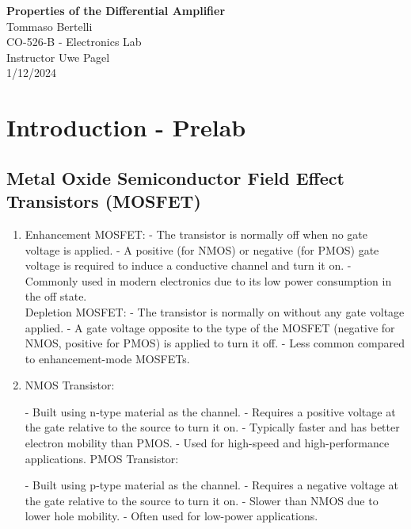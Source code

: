 \documentclass{article}
\begin{document}
	
	\mbox{}
	\vspace{10cm}
	\begin{center}
		\textbf{\Huge{Properties of the Differential Amplifier}}\\
		\bigskip
		\Large{Tommaso Bertelli}\\
		\bigskip
		\Large{CO-526-B - Electronics Lab}\\
		\bigskip
		\Large{Instructor Uwe Pagel}\\
		\bigskip
		\Large{1/12/2024}\\
	\end{center}
	\pagebreak
	
	\section{Introduction - Prelab}
		\subsection{Metal Oxide Semiconductor Field Effect Transistors (MOSFET)}
			\begin{enumerate}
				\item 
				Enhancement MOSFET:
				- The transistor is normally off when no gate voltage is applied.
				- A positive (for NMOS) or negative (for PMOS) gate voltage is required to induce a conductive channel and turn it on.
				- Commonly used in modern electronics due to its low power consumption in the off state.\\
				Depletion MOSFET:		
				- The transistor is normally on without any gate voltage applied.
				- A gate voltage opposite to the type of the MOSFET (negative for NMOS, positive for PMOS) is applied to turn it off.
				- Less common compared to enhancement-mode MOSFETs.
				\item 
				NMOS Transistor:
				
				- Built using n-type material as the channel.
				- Requires a positive voltage at the gate relative to the source to turn it on.
				- Typically faster and has better electron mobility than PMOS.
				- Used for high-speed and high-performance applications.
				PMOS Transistor:
				
				- Built using p-type material as the channel.
				- Requires a negative voltage at the gate relative to the source to turn it on.
				- Slower than NMOS due to lower hole mobility.
				- Often used for low-power applications.
			\end{enumerate}
\end{document}
